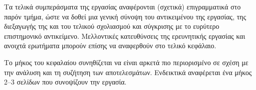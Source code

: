 Τα τελικά συμπεράσματα της εργασίας αναφέρονται (σχετικά) επιγραμματικά
στο παρόν τμήμα, ώστε να δοθεί μια γενική σύνοψη του αντικειμένου της εργασίας,
της διεξαγωγής της και του τελικού σχολιασμού και σύγκρισης με το ευρύτερο
επιστημονικό αντικείμενο. Μελλοντικές κατευθύνσεις της ερευνητικής εργασίας
και ανοιχτά ερωτήματα μπορούν επίσης να αναφερθούν στο τελικό κεφάλαιο.

Το μήκος του κεφαλαίου συνηθίζεται να είναι αρκετά πιο περιορισμένο σε σχέση
με την ανάλυση και τη συζήτηση των αποτελεσμάτων. Ενδεικτικά αναφέρεται
ένα μήκος 2--3  σελίδων που συνοψίζουν την εργασία.
